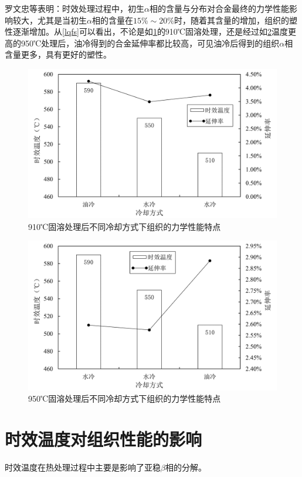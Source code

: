 罗文忠等表明：时效处理过程中，初生$\alpha$相的含量与分布对合金最终的力学性能影响较大，尤其是当初生$\alpha$相的含量在$15\% \sim 20\%$时，随着其含量的增加，组织的塑性逐渐增加。从\ref{lqfs}可以看出，不论是如\ref{910}的910℃固溶处理，还是经过如\ref{950}温度更高的950℃处理后，油冷得到的合金延伸率都比较高，可见油冷后得到的组织$\alpha$相含量更多，具有更好的塑性。
\begin{figure}[h!]
	\centering
			\includegraphics[width=1\linewidth]{pic/910℃固溶处理后不同冷却方式下组织的力学性能特点}
	\caption{910℃固溶处理后不同冷却方式下组织的力学性能特点}
	\label{910}
\end{figure}
\begin{figure}[h!]
	\centering
	\includegraphics[width=1\linewidth]{pic/950℃固溶处理后不同冷却方式下组织的力学性能特点}
	\caption{950℃固溶处理后不同冷却方式下组织的力学性能特点}
	\label{950}
\end{figure}

\section{时效温度对组织性能的影响}
时效温度在热处理过程中主要是影响了亚稳$\beta $相的分解。

